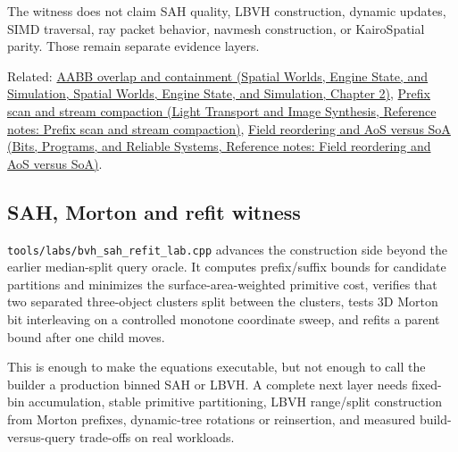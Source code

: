 The witness does not claim SAH quality, LBVH construction, dynamic updates, SIMD traversal, ray packet behavior, navmesh construction, or KairoSpatial parity. Those remain separate evidence layers.

Related: \href{../05-Spatial-Worlds-Engine-State-and-Simulation/main.pdf\#nameddest=03-visual-computing-i-ch021-axis-aligned-bounding-boxes}{AABB overlap and containment (Spatial Worlds, Engine State, and Simulation, Spatial Worlds, Engine State, and Simulation, Chapter 2)}, \href{../04-Light-Transport-and-Image-Synthesis/main.pdf\#nameddest=appendix-f2ee4d086415}{Prefix scan and stream compaction (Light Transport and Image Synthesis, Reference notes: Prefix scan and stream compaction)}, \href{../01-Bits-Programs-and-Reliable-Systems/main.pdf\#nameddest=appendix-5522ad176ca0}{Field reordering and AoS versus SoA (Bits, Programs, and Reliable Systems, Reference notes: Field reordering and AoS versus SoA)}.

\subsection{SAH, Morton and refit witness}\label{appendix-5653a7aea6bb-sah-morton-and-refit-witness}

\texttt{tools/labs/bvh\_sah\_refit\_lab.cpp} advances the construction side beyond the earlier median-split query oracle. It computes prefix/suffix bounds for candidate partitions and minimizes the surface-area-weighted primitive cost, verifies that two separated three-object clusters split between the clusters, tests 3D Morton bit interleaving on a controlled monotone coordinate sweep, and refits a parent bound after one child moves.

This is enough to make the equations executable, but not enough to call the builder a production binned SAH or LBVH. A complete next layer needs fixed-bin accumulation, stable primitive partitioning, LBVH range/split construction from Morton prefixes, dynamic-tree rotations or reinsertion, and measured build-versus-query trade-offs on real workloads.
